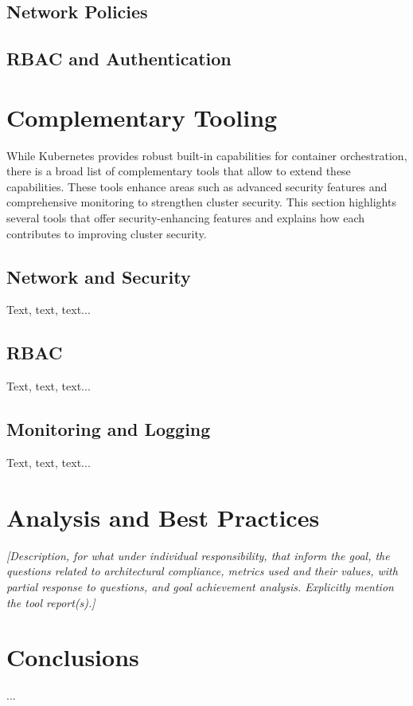 \documentclass[a4paper,11pt,openright,BCOR=15mm]{scrbook}
\begin{document}
	\section{Network Policies}
	
	\section{RBAC and Authentication}
	\label{sec:auth}
		
\chapter{Complementary Tooling}

While Kubernetes provides robust built-in capabilities for container orchestration, there is a broad list of complementary tools that allow to extend these capabilities.  These tools enhance areas such as advanced security features and comprehensive monitoring to strengthen cluster security. This section highlights several tools that offer security-enhancing features and explains how each contributes to improving cluster security.

\section{Network and Security}\label{sect:complementNetSec}
Text, text, text...

\section{RBAC}\label{sect:complmentRbac}
Text, text, text...

\section{Monitoring and Logging}\label{sect:complementMonitor}
Text, text, text...

	\chapter{Analysis and Best Practices}
 \textit{	[Description, for what under individual responsibility, that inform the goal, the questions related to architectural compliance, metrics used and their values, with partial response to questions, and goal achievement analysis. Explicitly mention the tool report(s).]}
	


	\chapter{Conclusions }
 ...\newline



%	
%	
%	
	
	\printbibliography[heading=bibintoc]
	
	
\end{document}
